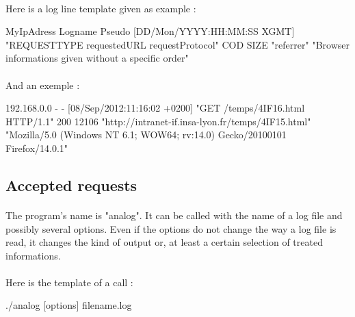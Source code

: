 \documentclass[a4paper, 12pts]{article}
\begin{document}
\paragraph{}
 Here is a log line template given as example :

 MyIpAdress Logname Pseudo [DD/Mon/YYYY:HH:MM:SS XGMT] "REQUESTTYPE requestedURL requestProtocol" COD SIZE "referrer" "Browser informations given without a specific order"

\paragraph{}
 And an exemple :

 192.168.0.0 - - [08/Sep/2012:11:16:02 +0200] "GET /temps/4IF16.html HTTP/1.1" 200 12106 "http://intranet-if.insa-lyon.fr/temps/4IF15.html" "Mozilla/5.0 (Windows NT 6.1; WOW64; rv:14.0) Gecko/20100101 Firefox/14.0.1"
 
\subsection{Accepted requests}
\paragraph{}
 The program's name is "analog". It can be called with the name of a log file and possibly several options. Even if the options do not change the way a log file is read, it changes the kind of output or, at least a certain selection of treated informations.
\paragraph{} 
Here is the template of a call :
 
./analog [options] filename.log
\end{document}
